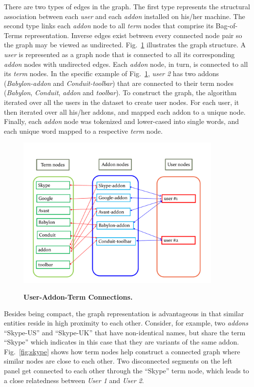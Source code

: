 \documentclass[10pt,letterpaper]{article}
\begin{document}
There are two types of edges in the graph. The first type represents the structural association between each \textit{user} and each \textit{addon} installed on his/her machine. The second type links each \textit{addon} node to all \textit{term} nodes that comprise its Bag-of-Terms representation. Inverse edges exist between every connected node pair so the graph may be viewed as undirected. Fig.~\ref{fig:conn} illustrates the graph structure. A \textit{user} is represented as a graph node that is connected to all its corresponding \textit{addon} nodes with undirected edges. Each \textit{addon} node, in turn, is connected to all its \textit{term} nodes. In the specific example of Fig.~\ref{fig:conn}, \textit{user 2} has two addons (\textit{Babylon-addon} and \textit{Conduit-toolbar}) that are connected to their term nodes (\textit{Babylon},\textit{ Conduit},\textit{ addon} and\textit{ toolbar}). To construct the graph, the algorithm iterated over all the users in the dataset to create user nodes. For each user, it then iterated over all his/her addons, and mapped each addon to a unique node. Finally, each \textit{addon} node was tokenized and lower-cased into single words, and each unique word mapped to a respective \textit{term} node.

\begin{figure}[!h]
\caption{{\bf User-Addon-Term Connections.}}
\includegraphics[width=4in]{figures/symbolic_graph.pdf}
\label{fig:conn}
\end{figure}

Besides being compact, the graph representation is advantageous in that similar entities reside in high proximity to each other. Consider, for example, two\textit{ addons} ``Skype-US'' and ``Skype-UK'' that have non-identical names, but share the term ``Skype'' which indicates in this case that they are variants of the same addon. Fig.~\ref{fig:skype} shows how term nodes help construct a connected graph where similar nodes are close to each other. Two disconnected segments on the left panel get connected to each other through the ``Skype'' term node, which leads to a close relatedness between\textit{ User 1} and\textit{ User 2}. 
\end{document}
